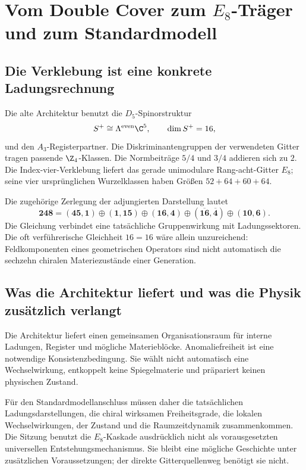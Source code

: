 \section{Vom Double Cover zum $E_8$-Träger und zum Standardmodell}

\subsection{Die Verklebung ist eine konkrete Ladungsrechnung}
Die alte Architektur benutzt die $D_5$-Spinorstruktur
\begin{equation}
S^+\cong\Lambda^{\mathrm{even}}\C^5,\qquad \dim S^+=16,
\end{equation}
und den $A_3$-Registerpartner. Die Diskriminantengruppen der verwendeten Gitter tragen passende $\Z_4$-Klassen. Die Normbeiträge $5/4$ und $3/4$ addieren sich zu $2$. Die Index-vier-Verklebung liefert das gerade unimodulare Rang-acht-Gitter $E_8$; seine vier ursprünglichen Wurzelklassen haben Größen $52+64+60+64$.

Die zugehörige Zerlegung der adjungierten Darstellung lautet
\begin{equation}
\mathbf{248}=(\mathbf{45},\mathbf1)\oplus(\mathbf1,\mathbf{15})
\oplus(\mathbf{16},\mathbf4)\oplus(\overline{\mathbf{16}},\overline{\mathbf4})
\oplus(\mathbf{10},\mathbf6).
\end{equation}
Die Gleichung verbindet eine tatsächliche Gruppenwirkung mit Ladungssektoren. Die oft verführerische Gleichheit $16=16$ wäre allein unzureichend: Feldkomponenten eines geometrischen Operators sind nicht automatisch die sechzehn chiralen Materiezustände einer Generation.

\subsection{Was die Architektur liefert und was die Physik zusätzlich verlangt}
Die Architektur liefert einen gemeinsamen Organisationsraum für interne Ladungen, Register und mögliche Materieblöcke. Anomaliefreiheit ist eine notwendige Konsistenzbedingung. Sie wählt nicht automatisch eine Wechselwirkung, entkoppelt keine Spiegelmaterie und präpariert keinen physischen Zustand.

Für den Standardmodellanschluss müssen daher die tatsächlichen Ladungsdarstellungen, die chiral wirksamen Freiheitsgrade, die lokalen Wechselwirkungen, der Zustand und die Raumzeitdynamik zusammenkommen. Die Sitzung benutzt die $E_8$-Kaskade ausdrücklich nicht als vorausgesetzten universellen Entstehungsmechanismus. Sie bleibt eine mögliche Geschichte unter zusätzlichen Voraussetzungen; der direkte Gitterquellenweg benötigt sie nicht.


